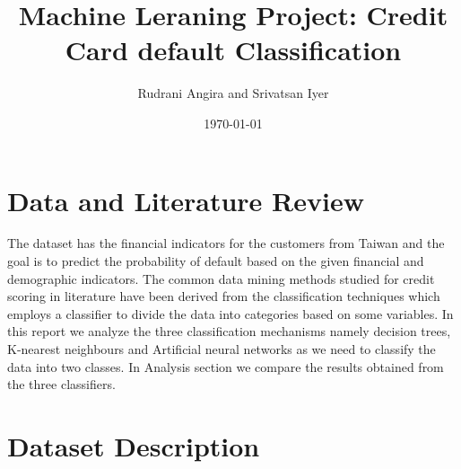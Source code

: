 \documentclass{article}
\title{Machine Leraning Project: Credit Card default Classification}
\author{Rudrani Angira and Srivatsan Iyer}
\date{\today}
\begin{document}
 
\maketitle
 
\section{Data and Literature Review}
 


 The dataset has the financial indicators for the customers from Taiwan and the goal is to predict the probability of default based on the given financial and demographic indicators. The common data mining methods studied for credit scoring in literature  have been derived from the classification techniques which employs a classifier to divide the data into categories based on some variables. In this report we analyze the three classification mechanisms namely decision trees, K-nearest neighbours and Artificial neural networks as we need to classify the data into two classes. In Analysis section we compare the results obtained from the three classifiers. 

\section{Dataset Description}
\end{document}
